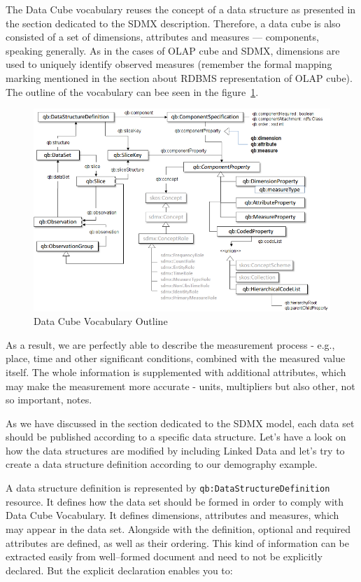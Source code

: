 The Data Cube vocabulary reuses the concept of a data structure as presented in the section
dedicated to the SDMX description. Therefore, a data cube is also consisted of a set of
dimensions, attributes and measures --- components, speaking generally. As in the cases of
OLAP cube and SDMX, dimensions are used to uniquely identify observed measures
(remember the formal mapping marking mentioned in the section about RDBMS representation
of OLAP cube). The outline of the vocabulary can bee seen in the 
figure~\ref{fig:lod-cloud}.
 
\begin{figure}
	\centering
	\includegraphics[width=150mm]{img/dcv-schema.png}
	\caption{Data Cube Vocabulary Outline~\cite{dcv}}
	\label{fig:lod-cloud}
\end{figure}

As a result, we are perfectly able to describe the measurement process - e.g., place, time and
other significant conditions, combined with the measured value itself. The whole information
is supplemented with additional attributes, which may make the measurement more accurate
- units, multipliers but also other, not so important, notes.

As we have discussed in the section dedicated to the SDMX model, each data set should be
published according to a specific data structure. Let’s have a look on how the data structures are
modified by including Linked Data and let’s try to create a data structure definition according
to our demography example.

A data structure definition is represented by \texttt{qb:DataStructureDefinition} resource. It defines
how the data set should be formed in order to comply with Data Cube Vocabulary. It defines
dimensions, attributes and measures, which may appear in the data set. Alongside with the
definition, optional and required attributes are defined, as well as their ordering. This kind
of information can be extracted easily from well--formed document and need to not be explicitly
declared. But the explicit declaration enables you to:


